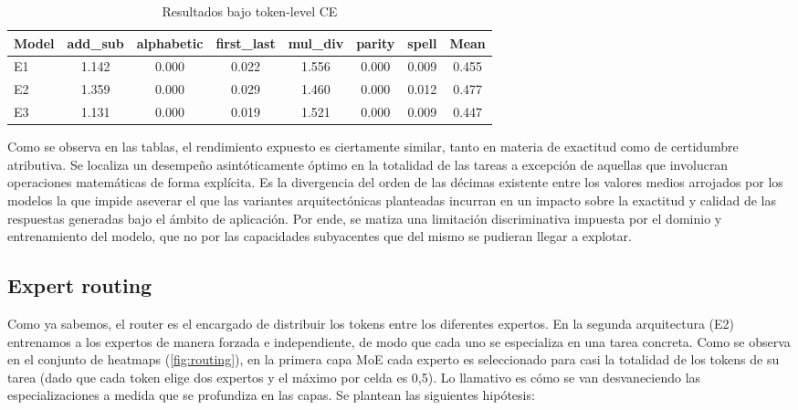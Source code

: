 \documentclass[10pt,twocolumn,a4paper]{article}
\begin{document}
{
\setlength{\tabcolsep}{2pt}
\scriptsize

\begin{table}[ht]
\centering
\caption{Resultados bajo token-level CE}
\label{tab:stats}
\small
\begin{tabular}{@{}lccccccc@{}}
\toprule
\textbf{Model} & \textbf{add\_sub} & \textbf{alphabetic}
& \textbf{first\_last} & \textbf{mul\_div}
& \textbf{parity} & \textbf{spell} & \textbf{Mean} \\
\midrule
E1 & 1.142 & 0.000 & 0.022 & 1.556 & 0.000 & 0.009 & 0.455 \\
E2 &  1.359 & 0.000 & 0.029 & 1.460 & 0.000 & 0.012 & 0.477 \\
E3 & 1.131 & 0.000 & 0.019 & 1.521 & 0.000 &  0.009 & 0.447 \\
\bottomrule
\end{tabular}
\end{table}
}

Como se observa en las tablas, el rendimiento expuesto es ciertamente similar, tanto en materia de exactitud como de certidumbre atributiva. Se localiza un desempeño asintóticamente óptimo en la totalidad de las tareas a excepción de aquellas que involucran operaciones matemáticas de forma explícita. Es la divergencia del orden de las décimas existente entre los valores medios arrojados por los modelos la que impide aseverar el que las variantes arquitectónicas planteadas incurran en un impacto sobre la exactitud y calidad de las respuestas generadas bajo el ámbito de aplicación. Por ende, se matiza una limitación discriminativa impuesta por el dominio y entrenamiento del modelo, que no por las capacidades subyacentes que del mismo se pudieran llegar a explotar.

\subsection{Expert routing}
\label{sec:e1}
Como ya sabemos, el router es el encargado de distribuir los tokens entre los diferentes expertos. En la segunda arquitectura (E2) entrenamos a los expertos de manera forzada e independiente, de modo que cada uno se especializa en una tarea concreta. Como se observa en el conjunto de heatmaps (\cref{fig:routing}), en la primera capa MoE cada experto es seleccionado para casi la totalidad de los tokens de su tarea (dado que cada token elige dos expertos y el máximo por celda es 0,5). Lo llamativo es cómo se van desvaneciendo las especializaciones a medida que se profundiza en las capas. Se plantean las siguientes hipótesis:
\end{document}
